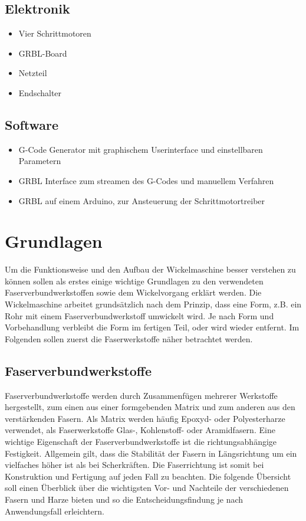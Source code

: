 \documentclass[paper=A4,pagesize,DIV=18, 12pt,listof=totoc,bibliography=totoc,headings=optiontohead,open=any]{article}
\begin{document}
\subsection{Elektronik}
\begin{itemize}
    \item Vier Schrittmotoren
    \item GRBL-Board 
    \item Netzteil
    \item Endschalter
\end{itemize}


\subsection{Software}
\begin{itemize}
    \item G-Code Generator mit graphischem Userinterface und einstellbaren Parametern
    \item GRBL Interface zum streamen des G-Codes und manuellem Verfahren
    \item GRBL auf einem Arduino, zur Ansteuerung der Schrittmotortreiber
\end{itemize}

\section{Grundlagen}
Um die Funktionsweise und den Aufbau der Wickelmaschine besser verstehen zu können sollen als erstes einige wichtige Grundlagen zu den verwendeten Faserverbundwerkstoffen sowie dem Wickelvorgang erklärt werden. Die Wickelmaschine arbeitet grundsätzlich nach dem Prinzip, dass eine Form, z.B. ein Rohr mit einem Faserverbundwerkstoff umwickelt wird. Je nach Form und Vorbehandlung verbleibt die Form im fertigen Teil, oder wird wieder entfernt. Im Folgenden sollen zuerst die Faserwerkstoffe näher betrachtet werden.

\subsection{Faserverbundwerkstoffe}
Faserverbundwerkstoffe werden durch Zusammenfügen mehrerer Werkstoffe hergestellt, zum einen aus einer formgebenden Matrix und zum anderen aus den verstärkenden Fasern. Als Matrix werden häufig Epoxyd- oder Polyesterharze verwendet, als Faserwerkstoffe Glas-, Kohlenstoff- oder Aramidfasern. Eine wichtige Eigenschaft der Faserverbundwerkstoffe ist die richtungsabhängige Festigkeit. Allgemein gilt, dass die Stabilität der Fasern in Längsrichtung um ein vielfaches höher ist als bei Scherkräften. Die Faserrichtung ist somit bei Konstruktion und Fertigung auf jeden Fall zu beachten.  Die folgende Übersicht soll einen Überblick über die wichtigsten Vor- und Nachteile der verschiedenen Fasern und Harze bieten und so die Entscheidungsfindung je nach Anwendungsfall erleichtern. \cite{r_g_wiki}
\end{document}
